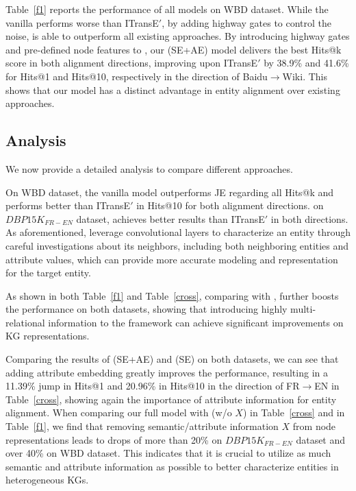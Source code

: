  Table~\ref{f1} reports the performance of all models on WBD dataset. While the vanilla \GCN performs worse than
ITransE$'$, by adding highway gates to control the noise, \HGCN is able to outperform all existing approaches. By introducing highway gates and pre-defined node features to \RGCN, our \HRGCN (SE+AE) model delivers the best Hits@k score in both alignment directions,
improving upon ITransE$'$ by 38.9\% and 41.6\% for Hits@1 and Hits@10, respectively in the direction of
Baidu$\rightarrow$Wiki. This shows that our model has a distinct advantage in entity alignment over existing approaches.



\subsection{Analysis\label{sec:analysis}}



We now provide a detailed analysis to compare different approaches.

On WBD dataset, the vanilla \GCN model outperforms JE regarding all Hits@k and performs better than ITransE$'$ in Hits@10 for both alignment directions. on $DBP15K_{FR-EN}$ dataset, \GCN achieves better results than ITransE$'$ in both directions. As aforementioned, \GCNs leverage convolutional layers to characterize an entity through careful investigations about its neighbors, including both neighboring entities and attribute values, which can provide more accurate modeling and representation for the target entity.

 As shown in both Table~\ref{f1} and Table~\ref{cross}, comparing with \GCN, \RGCN further boosts the performance on both datasets, showing that introducing highly multi-relational information to the \GCN framework can achieve significant improvements on KG representations.


Comparing the results of \HRGCN (SE+AE) and \HRGCN (SE) on both datasets, we can see that adding attribute embedding greatly improves the performance, resulting in a 11.39\% jump in Hits@1 and 20.96\% in Hits@10 in the direction of FR$\rightarrow$EN in Table~\ref{cross}, showing again the importance of attribute information for entity alignment.
When comparing our full model \HRGCN with \HRGCN (w/o $X$) in Table~\ref{cross} and in Table~\ref{f1}, we find that removing semantic/attribute information $X$ from node representations leads to drops of more than 20\% on $DBP15K_{FR-EN}$ dataset and over 40\% on WBD dataset. This indicates that it is crucial to utilize
as much semantic and attribute information as possible to better characterize entities in heterogeneous KGs.

